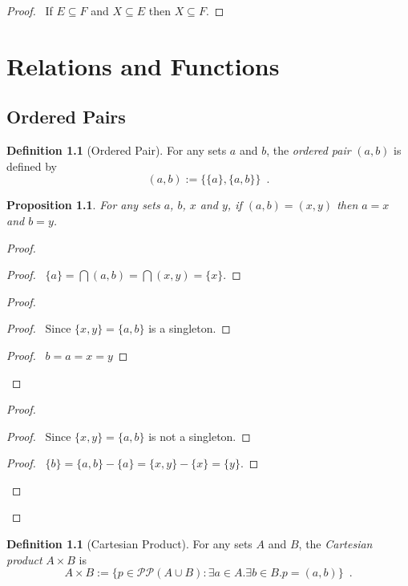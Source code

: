 \documentclass{report}
\let\qed\relax
\newtheorem{prop}[ax]{Proposition}
\theoremstyle{definition}
\newtheorem{df}[ax]{Definition}
\begin{document}
\begin{proof}
\pf\ If $E \subseteq F$ and $X \subseteq E$ then $X \subseteq F$. \qed
\end{proof}

\chapter{Relations and Functions}

\section{Ordered Pairs}

\begin{df}[Ordered Pair]
For any sets $a$ and $b$, the \emph{ordered pair} $(a,b)$ is defined by
\[ (a,b) := \{ \{ a \}, \{ a, b \} \} \enspace . \]
\end{df}

\begin{prop}
For any sets $a$, $b$, $x$ and $y$, if $(a,b) = (x,y)$ then $a = x$ and $b = y$.
\end{prop}

\begin{proof}
\pf
{}
\begin{proof}
	\pf\ $\{a\} = \bigcap (a,b) = \bigcap (x,y) = \{x\}$.
\end{proof}
\begin{proof}
	\begin{proof}
		\pf\ Since $\{x,y\} = \{a,b\}$ is a singleton.
	\end{proof}
	\begin{proof}
		\pf\ $b = a = x = y$
	\end{proof}
\end{proof}
\begin{proof}
	\begin{proof}
		\pf\ Since $\{x,y\} = \{a,b\}$ is not a singleton.
	\end{proof}
	\begin{proof}
		\pf\ $\{b\} = \{a,b\} - \{a\} = \{x,y\} - \{x\} = \{y\}$.
	\end{proof}
\end{proof}
\qed
\end{proof}

\begin{df}[Cartesian Product]
For any sets $A$ and $B$, the \emph{Cartesian product} $A \times B$ is
\[ A \times B := \{ p \in \mathcal{P} \mathcal{P} (A \cup B) : \exists a \in A. \exists b \in B. p = (a,b) \} \enspace . \]
\end{df}
\end{document}
